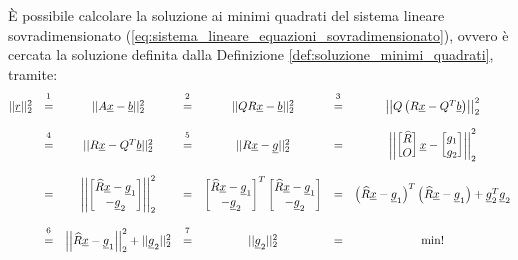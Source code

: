 È possibile calcolare la soluzione ai minimi quadrati del sistema lineare sovradimensionato (\ref{eq:sistema_lineare_equazioni_sovradimensionato}), ovvero è cercata la soluzione definita dalla Definizione \ref{def:soluzione_minimi_quadrati}, tramite:
\begin{equation}\label{eq:norma_2_residuo_minimo}
    \begin{matrix}
        ||\uline r||_2^2 &\overset{\footnotemark}{=}& ||A\uline x-\uline b||_2^2 &\overset{\footnotemark}{=}&||QR\uline x-\uline b||_2^2 &\overset{\footnotemark}{=}& \left|\left|Q\left(R\uline x-Q^T\uline b\right)\right|\right|_2^2\\\\
        &\overset{\footnotemark}{=}& ||R\uline x-Q^T\uline b||_2^2 &\overset{\footnotemark}{=}& ||R\uline x - \uline g||_2^2 &=& 
        \left|\left|\begin{bmatrix}
            \widehat R\\
            O
        \end{bmatrix}\uline x - 
        \begin{bmatrix}
            g_1\\
            g_2
        \end{bmatrix}\right|\right|_2^2\\\\
        &=& \left|\left|\begin{bmatrix}
            \widehat R\uline x-\uline g_1\\
            -\uline g_2
        \end{bmatrix}\right|\right|_2^2 &=&
        \begin{bmatrix}
            \widehat R\uline x-\uline g_1\\
            -\uline g_2
        \end{bmatrix}^T
        \begin{bmatrix}
            \widehat R\uline x-\uline g_1\\
            -\uline g_2
        \end{bmatrix}&=& \left(\widehat R\uline x-\uline g_1\right)^T\left(\widehat R\uline x-\uline g_1\right)+\uline g_2^T\uline g_2 \\\\
        &\overset{\footnotemark}{=}& \left|\left|\widehat R\uline x - \uline g_1\right|\right|_2^2+||\uline g_2||_2^2 &\overset{\footnotemark}{=}& ||\uline g_2||_2^2&=&\min !
    \end{matrix}
\end{equation}

